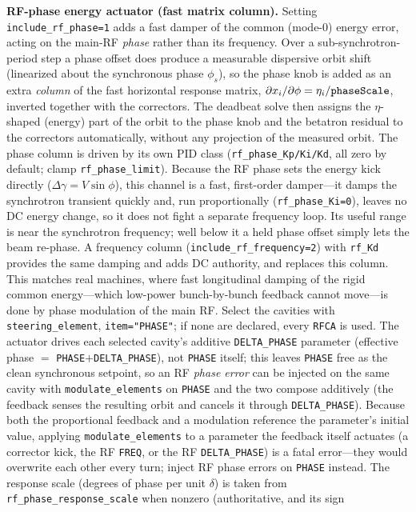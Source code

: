 \documentclass[11pt]{article}
\begin{document}
\textbf{RF-phase energy actuator (fast matrix column).}  Setting \verb|include_rf_phase=1|
adds a fast damper of the common (mode-0) energy error, acting on the main-RF \emph{phase}
rather than its frequency.  Over a sub-synchrotron-period step a phase offset does produce a
measurable dispersive orbit shift (linearized about the synchronous phase $\phi_s$), so the
phase knob is added as an extra \emph{column} of the fast horizontal response matrix,
$\partial x_i/\partial\phi=\eta_i/\verb|phaseScale|$, inverted together with the correctors.
The deadbeat solve then assigns the $\eta$-shaped (energy) part of the orbit to the phase
knob and the betatron residual to the correctors automatically, without any projection of
the measured orbit.  The phase column is driven by its own
PID class (\verb|rf_phase_Kp/Ki/Kd|, all zero by default; clamp \verb|rf_phase_limit|).  Because
the RF phase sets the energy kick directly ($\Delta\gamma=V\sin\phi$), this channel is a fast,
first-order damper---it damps the synchrotron transient quickly and, run proportionally
(\verb|rf_phase_Ki=0|), leaves no DC energy change, so it does not fight a separate frequency
loop.  Its useful range is near the synchrotron frequency; well below it a held phase offset
simply lets the beam re-phase.  A frequency column (\verb|include_rf_frequency=2|) with
\verb|rf_Kd| provides the same damping and adds DC authority, and replaces this column.  This matches real machines, where fast longitudinal damping of the rigid common
energy---which low-power bunch-by-bunch feedback cannot move---is done by phase modulation of
the main RF.  Select the cavities with \verb|steering_element|, \verb|item="PHASE"|; if none
are declared, every \verb|RFCA| is used.  The actuator drives each selected cavity's additive
\verb|DELTA_PHASE| parameter (effective phase $=$ \verb|PHASE|$+$\verb|DELTA_PHASE|), not
\verb|PHASE| itself; this leaves \verb|PHASE| free as the clean synchronous setpoint, so an RF
\emph{phase error} can be injected on the same cavity with \verb|modulate_elements| on
\verb|PHASE| and the two compose additively (the feedback senses the resulting orbit and
cancels it through \verb|DELTA_PHASE|).  Because both the proportional feedback and a modulation
reference the parameter's initial value, applying \verb|modulate_elements| to a parameter the
feedback itself actuates (a corrector kick, the RF \verb|FREQ|, or the RF \verb|DELTA_PHASE|) is
a fatal error---they would overwrite each other every turn; inject RF phase errors on
\verb|PHASE| instead.  The response scale (degrees of phase per unit
$\delta$) is taken from \verb|rf_phase_response_scale| when nonzero (authoritative, and its sign
\end{document}
